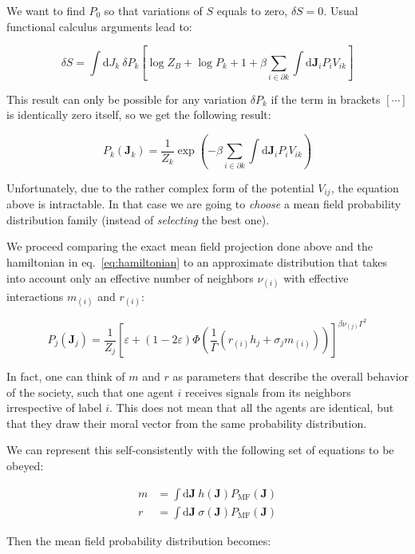 \documentclass[12pt,a4paperpaper,]{tufte-book}
\begin{document}
We want to find \(P_0\) so that variations of \(S\) equals to zero, \(\delta S = 0\). Usual functional calculus arguments lead to:

\[ \delta S = \int \mathrm{d} J_k\ \delta P_k \left[ \log Z_B + \log P_k + 1 + \beta \sum_{i \in \partial k} \int \mathrm{d}\mathbf{J}_i P_i V_{ik} \right] \]

This result can only be possible for any variation \(\delta P_k\) if the term in brackets \(\left[ \cdots \right]\) is identically zero itself, so we get the following result:

\begin{equation} P_k(\mathbf{J}_k) = \frac{1}{Z_k} \exp \left( - \beta \sum_{i \in \partial k} \int \mathrm{d}\mathbf{J}_i P_i V_{ik} \right)\label{eq:meanfieldexact}\end{equation}

Unfortunately, due to the rather complex form of the potential \(V_{ij}\), the equation above is intractable. In that case we are going to \emph{choose} a mean field probability distribution family (instead of \emph{selecting} the best one).

We proceed comparing the exact mean field projection done above and the hamiltonian in eq.~\ref{eq:hamiltonian} to an approximate distribution that takes into account only an effective number of neighbors \(\nu_{(i)}\) with effective interactions \(m_{(i)}\) and \(r_{(i)}\):

\[ P_j(\mathbf{J}_j) = \frac{1}{Z_j} \left[ \varepsilon + \left(1 - 2\varepsilon\right) \Phi \left( \frac1\Gamma \left( r_{(i)} h_j + \sigma_j m_{(i)} \right) \right) \right]^{\beta \nu_{(j)} \Gamma^2} \]

In fact, one can think of \(m\) and \(r\) as parameters that describe the overall behavior of the society, such that one agent \(i\) receives signals from its neighbors irrespective of label \(i\). This does not mean that all the agents are identical, but that they draw their moral vector from the same probability distribution.

We can represent this self-consistently with the following set of equations to be obeyed:

\begin{align}
    m &= \int \mathrm{d}\mathbf{J}\ h(\mathbf{J}) P_\mathrm{MF}(\mathbf{J}) \\
    r &= \int \mathrm{d}\mathbf{J}\ \sigma(\mathbf{J}) P_\mathrm{MF}(\mathbf{J})
\end{align}

Then the mean field probability distribution becomes:
\end{document}
